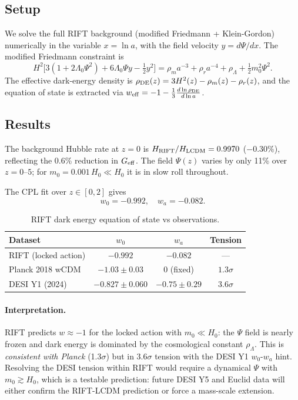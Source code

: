 \documentclass[12pt,a4paper]{article}
\begin{document}
\subsection{Setup}

We solve the full RIFT background (modified Friedmann + Klein-Gordon)
numerically in the variable $x=\ln a$, with the field velocity
$y=d\Psi/dx$.  The modified Friedmann constraint is
\begin{equation}
  H^2\bigl[3(1+2\Lambda_0\Psi^2) + 6\Lambda_0\Psi y - \tfrac{1}{2}y^2\bigr]
  = \rho_m a^{-3} + \rho_r a^{-4} + \rho_\Lambda + \tfrac{1}{2}m_0^2\Psi^2 .
\end{equation}
The effective dark-energy density is $\rho_{\rm DE}(z) = 3H^2(z) - \rho_m(z) - \rho_r(z)$,
and the equation of state is extracted via
$w_{\rm eff} = -1 - \frac{1}{3}\frac{d\ln\rho_{\rm DE}}{d\ln a}$.

\subsection{Results}

The background Hubble rate at $z=0$ is $H_{\rm RIFT}/H_{\rm LCDM}=0.9970$
($-0.30\%$), reflecting the 0.6\% reduction in $G_{\rm eff}$.
The field $\Psi(z)$ varies by only 11\% over $z=0$--$5$; for
$m_0=0.001\,H_0\ll H_0$ it is in slow roll throughout.

The CPL fit over $z\in[0,2]$ gives
\begin{equation}
  w_0 = -0.992,\quad w_a = -0.082 .
\end{equation}

\begin{table}[h]
\centering
\caption{RIFT dark energy equation of state vs observations.}
\begin{tabular}{lccc}
\hline
Dataset & $w_0$ & $w_a$ & Tension \\
\hline
RIFT (locked action) & $-0.992$ & $-0.082$ & --- \\
Planck 2018 wCDM     & $-1.03\pm0.03$ & $0$ (fixed) & $1.3\sigma$ \\
DESI Y1 (2024)       & $-0.827\pm0.060$ & $-0.75\pm0.29$ & $3.6\sigma$ \\
\hline
\end{tabular}
\label{tab:wde}
\end{table}

\paragraph{Interpretation.}
RIFT predicts $w\approx-1$ for the locked action with $m_0\ll H_0$:
the $\Psi$ field is nearly frozen and dark energy is dominated by the
cosmological constant $\rho_\Lambda$.  This is \emph{consistent with
Planck} (1.3$\sigma$) but in 3.6$\sigma$ tension with the DESI Y1
$w_0$-$w_a$ hint.  Resolving the DESI tension within RIFT would require
a dynamical $\Psi$ with $m_0\gtrsim H_0$, which is a testable
prediction: future DESI Y5 and Euclid data will either confirm the
RIFT-LCDM prediction or force a mass-scale extension.
\end{document}
